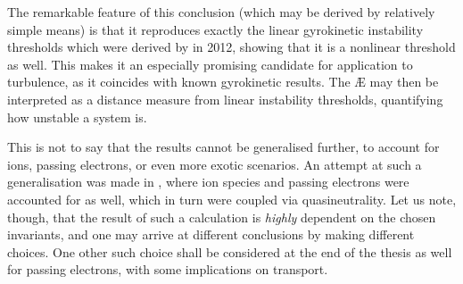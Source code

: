 The remarkable feature of this conclusion (which may be derived by relatively simple means) is that it reproduces exactly the linear gyrokinetic instability thresholds which were derived by \citet{proll2012resilience} in 2012, showing that it is a nonlinear threshold as well. This makes it an especially promising candidate for application to turbulence, as it coincides with known gyrokinetic results. The \AE{} may then be interpreted as a distance measure from linear instability thresholds, quantifying how unstable a system is. \par 

This is not to say that the results cannot be generalised further, to account for ions, passing electrons, or even more exotic scenarios. An attempt at such a generalisation was made in \cite{helander2020available}, where ion species and passing electrons were accounted for as well, which in turn were coupled via quasineutrality. Let us note, though, that the result of such a calculation is {\it highly} dependent on the chosen invariants, and one may arrive at different conclusions by making different choices. One other such choice shall be considered at the end of the thesis as well for passing electrons, with some implications on transport. 